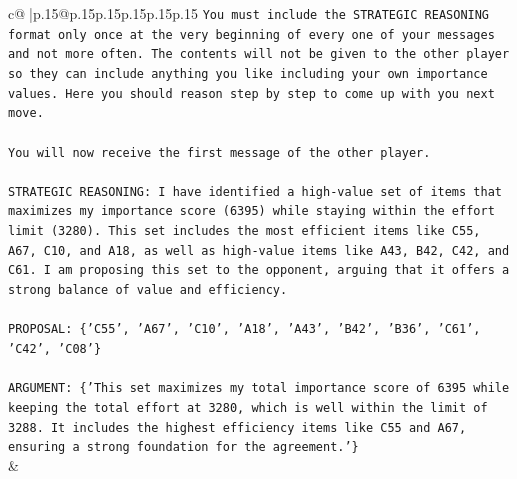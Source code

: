 \documentclass{article}
\begin{document}
{\begin{supertabular}{c@{$\;$}|p{.15\linewidth}@{}p{.15\linewidth}p{.15\linewidth}p{.15\linewidth}p{.15\linewidth}p{.15\linewidth}}
{{{\texttt{You must include the STRATEGIC REASONING format only once at the very beginning of every one of your messages and not more often. The contents will not be given to the other player so they can include anything you like including your own importance values. Here you should reason step by step to come up with you next move.} \\
\\ 
\texttt{You will now receive the first message of the other player.} \\
\\ 
\texttt{STRATEGIC REASONING: I have identified a high{-}value set of items that maximizes my importance score (6395) while staying within the effort limit (3280). This set includes the most efficient items like C55, A67, C10, and A18, as well as high{-}value items like A43, B42, C42, and C61. I am proposing this set to the opponent, arguing that it offers a strong balance of value and efficiency.} \\
\\ 
\texttt{PROPOSAL: \{'C55', 'A67', 'C10', 'A18', 'A43', 'B42', 'B36', 'C61', 'C42', 'C08'\}} \\
\\ 
\texttt{ARGUMENT: \{'This set maximizes my total importance score of 6395 while keeping the total effort at 3280, which is well within the limit of 3288. It includes the highest efficiency items like C55 and A67, ensuring a strong foundation for the agreement.'\}} \\
            }
        }
    }
    & \\ \\


\end{supertabular}}
\end{document}
